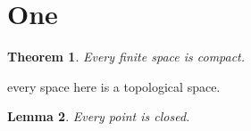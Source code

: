 \documentclass{article}
\newtheorem{theorem}{Theorem}[section]
\newtheorem{lemma}[theorem]{Lemma}
\begin{document}
\section{One}
\begin{theorem} Every finite space is compact. \end{theorem}
\note
every space here is a topological space.

\begin{lemma} Every point is closed. \end{lemma}
\end{document}
